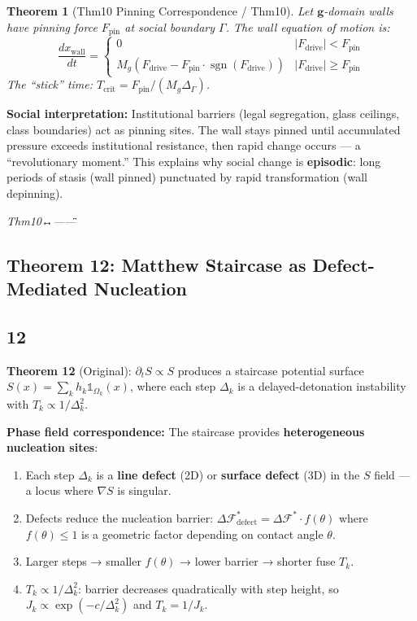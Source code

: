 \documentclass[12pt,a4paper]{article}
\theoremstyle{plain}
\newtheorem{theorem}{ Theorem}[section]
\theoremstyle{definition}
\newcommand{\cF}{\mathcal{F}}
\newcommand{\gf}{\mathbf{g}}          %
\newcommand{\Sf}{S}                   %
\DeclareMathOperator{\sgn}{sgn}
\newcommand{\cn}[1]{\textcolor{scxgray}{\textit{#1}}}
\begin{document}
\begin{theorem}[Thm10 Pinning Correspondence / Thm10]
\label{thm:thm10_pinning}
Let $\gf$-domain walls have pinning force $F_{\text{pin}}$ at social boundary
$\Gamma$. The wall equation of motion is:
\begin{equation}
    \frac{dx_{\text{wall}}}{dt} =
    \begin{cases}
        0 & |F_{\text{drive}}| < F_{\text{pin}} \\
        M_g(F_{\text{drive}} - F_{\text{pin}}\cdot\sgn(F_{\text{drive}})) & |F_{\text{drive}}| \ge F_{\text{pin}}
    \end{cases}
    \label{eq:pinning_dynamics}
\end{equation}
The ``stick'' time: $T_{\text{crit}} = F_{\text{pin}}/(M_g\Delta_\Gamma)$.
\end{theorem}

\textbf{Social interpretation:} Institutional barriers (legal segregation,
glass ceilings, class boundaries) act as pinning sites. The wall stays
pinned until accumulated pressure exceeds institutional resistance, then
rapid change occurs — a ``revolutionary moment.'' This explains why social
change is \textbf{episodic}: long periods of stasis (wall pinned) punctuated
by rapid transformation (wall depinning).

\bigskip
\noindent
\cn{Thm10↔——\"\"}

\subsection{Theorem 12: Matthew Staircase as Defect-Mediated Nucleation}
\subsection*{12}

\textbf{Theorem 12} (Original): $\partial_t\Sf \propto \Sf$ produces a
staircase potential surface $\Sf(x) = \sum_k h_k \mathbb{1}_{\Omega_k}(x)$,
where each step $\Delta_k$ is a delayed-detonation instability with
$T_k \propto 1/\Delta_k^2$.

\textbf{Phase field correspondence:} The staircase provides \textbf{heterogeneous
nucleation sites}:

\begin{enumerate}[label=(\arabic*)]
    \item Each step $\Delta_k$ is a \textbf{line defect} (2D) or \textbf{surface
          defect} (3D) in the $\Sf$ field — a locus where $\nabla\Sf$ is singular.
    \item Defects reduce the nucleation barrier:
          $\Delta\cF^*_{\text{defect}} = \Delta\cF^*\cdot f(\theta)$ where
          $f(\theta)\le 1$ is a geometric factor depending on contact angle $\theta$.
    \item Larger steps → smaller $f(\theta)$ → lower barrier → shorter fuse $T_k$.
    \item $T_k \propto 1/\Delta_k^2$: barrier decreases quadratically with step
          height, so $J_k \propto \exp(-c/\Delta_k^2)$ and $T_k = 1/J_k$.
\end{enumerate}
\end{document}
